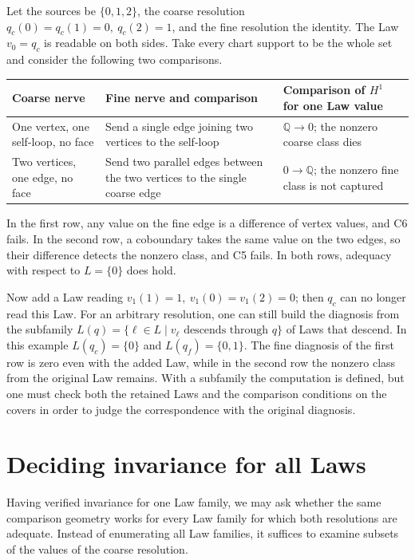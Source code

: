 \begin{example}\label{ex:3.19}

Let the sources be $\{0,1,2\}$, the coarse resolution
$q_c(0)=q_c(1)=0,\ q_c(2)=1$, and the fine resolution the identity.
The Law $v_0=q_c$ is readable on both sides.
Take every chart support to be the whole set and consider the following two comparisons.

\begin{xltabular}{\linewidth}{@{}LLL@{}}
\toprule
Coarse nerve & Fine nerve and comparison & Comparison of $H^1$ for one Law value \\
\midrule
\endhead
One vertex, one self-loop, no face & Send a single edge joining two vertices to the self-loop & $\mathbb{Q}\to0$; the nonzero coarse class dies \\
\addlinespace[3pt]
Two vertices, one edge, no face & Send two parallel edges between the two vertices to the single coarse edge & $0\to\mathbb{Q}$; the nonzero fine class is not captured \\
\bottomrule
\end{xltabular}

In the first row, any value on the fine edge is a difference of vertex values, and C6
fails. In the second row, a coboundary takes the same value on the two edges, so
their difference detects the nonzero class, and C5 fails.
In both rows, adequacy with respect to $L=\{0\}$ does hold.

Now add a Law reading $v_1(1)=1,\ v_1(0)=v_1(2)=0$; then $q_c$ can no longer read
this Law.
For an arbitrary resolution, one can still build the diagnosis from the subfamily
$L(q)=\{\ell\in L\mid v_\ell\text{ descends through }q\text{}\}$
of Laws that descend. In this example $L(q_c)=\{0\}$ and
$L(q_f)=\{0,1\}$.
The fine diagnosis of the first row is zero even with the added Law, while in the
second row the nonzero class from the original Law remains.
With a subfamily the computation is defined, but one must check both the retained
Laws and the comparison conditions on the covers in order to judge the correspondence
with the original diagnosis.

\end{example}

\section{Deciding invariance for all Laws}\label{sec:3.6}

Having verified invariance for one Law family, we may ask whether the same comparison
geometry works for every Law family for which both resolutions are adequate.
Instead of enumerating all Law families, it suffices to examine subsets of the values
of the coarse resolution.

